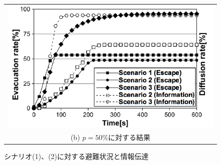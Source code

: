 \documentclass[a4j]{jarticle}
\begin{document}
\begin{figure}[h]
\begin{tabular}{c}
\includegraphics[height=\linewidth,angle=-90]{fig/p-50-plot-with-legend.pdf}\\
(b) $p=50\%$に対する結果\\
\end{tabular}
\caption{シナリオ(1)、(2)に対する避難状況と情報伝達}
\label{fig:exp-1}
\end{figure}
\end{document}
